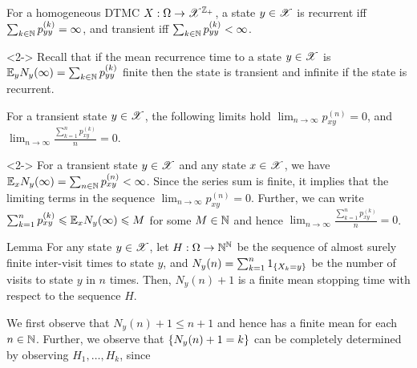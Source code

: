 \documentclass[12pt,aspectratio=169]{beamer}
\begin{document}
\begin{frame}
\begin{prop}
For a homogeneous DTMC $X: \Omega \to \mathscr{X}^{\mathbb{Z}_+}$, a state $y\in\mathscr{X}$ is recurrent iff
$\sum_{k\in\mathbb{N}} p_{yy}^{(k)} = \infty$, and transient iff $\sum_{k\in\mathbb{N}} p_{yy}^{(k)} < \infty$.
\end{prop}
\begin{Proof}<2->
Recall that if the mean recurrence time to a state $y\in\mathscr{X}$ is $\mathbb{E}_yN_y(\infty) = \sum_{k\in\mathbb{N}}p_{yy}^{(k)}$ finite then the state is transient and infinite if the state is recurrent.
\end{Proof}
\end{frame}
\begin{frame}
\begin{cor} 
For a transient state $y \in \mathscr{X}$, the following limits hold 
$\lim_{n \to \infty}p_{xy}^{(n)} = 0$, and $\lim_{n \to \infty}\frac{\sum_{k = 1}^np_{xy}^{(k)}}{n} = 0$.
\end{cor}
\begin{Proof}<2->
For a transient state $y \in \mathscr{X}$ and any state $x \in \mathscr{X}$, we have $\mathbb{E}_xN_y(\infty)  = \sum_{n \in \mathbb{N}}p_{xy}^{(n)} < \infty$. 
Since the series sum is finite, it implies that the limiting terms in the sequence $\lim_{n \to \infty}p_{xy}^{(n)} = 0$. 
Further, we can write $\sum_{k=1}^np_{xy}^{(k)} \leqslant \mathbb{E}_xN_y(\infty) \leqslant M$ for some $M \in \mathbb{N}$ and hence $\lim_{n \to \infty}\frac{\sum_{k = 1}^np_{xy}^{(k)}}{n} = 0$.
\end{Proof}
\end{frame}
\begin{frame}
\begin{block}{Lemma} 
\label{lem:StoppingTime}
For any state $y \in \mathscr{X}$, let $H:\Omega\to\mathbb{N}^{\mathbb{N}}$ be the sequence of almost surely finite inter-visit times to state $y$, 
and $N_y(n) = \sum_{k=1}^n1_{\left\{X_k = y\right\}}$ be the number of visits to state $y$ in $n$ times. 
Then, $N_y(n) +1$ is a finite mean stopping time with respect to the sequence $H$. 
\end{block}
\end{frame}
\begin{frame}
\begin{Proof} 
We first observe that $N_y(n) + 1 \le n+1$ and hence has a finite mean for each $n \in \mathbb{N}$. 
Further, we observe that $\left\{N_y(n) + 1 = k\right\}$ can be completely determined by observing $H_1, \dots, H_k$, since 
\end{Proof}
\end{frame}
\end{document}
